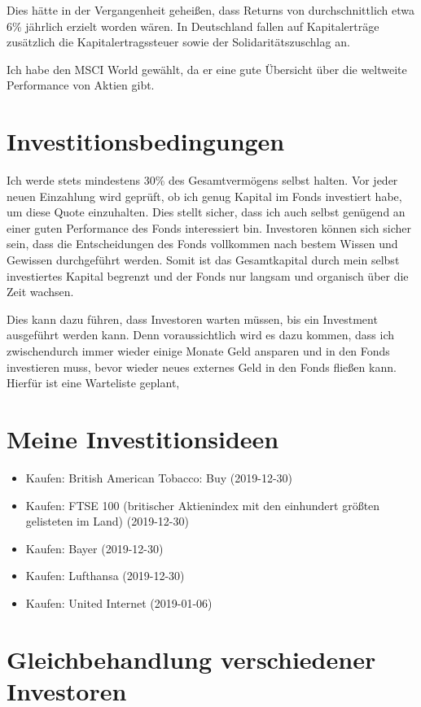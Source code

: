 \documentclass{article}
\begin{document}
Dies hätte in der Vergangenheit geheißen, dass Returns von durchschnittlich etwa 6\% jährlich erzielt worden wären. In Deutschland fallen auf Kapitalerträge zusätzlich die Kapitalertragssteuer sowie der Solidaritätszuschlag an.

Ich habe den MSCI World gewählt, da er eine gute Übersicht über die weltweite Performance von Aktien gibt.

\section{Investitionsbedingungen}

Ich werde stets mindestens 30\% des Gesamtvermögens selbst halten. Vor jeder neuen Einzahlung wird geprüft, ob ich genug Kapital im Fonds investiert habe, um diese Quote einzuhalten. Dies stellt sicher, dass ich auch selbst genügend an einer guten Performance des Fonds interessiert bin. Investoren können sich sicher sein, dass die Entscheidungen des Fonds vollkommen nach bestem Wissen und Gewissen durchgeführt werden. Somit ist das Gesamtkapital durch mein selbst investiertes Kapital begrenzt und der Fonds nur langsam und organisch über die Zeit wachsen.

Dies kann dazu führen, dass Investoren warten müssen, bis ein Investment ausgeführt werden kann. Denn voraussichtlich wird es dazu kommen, dass ich zwischendurch immer wieder einige Monate Geld ansparen und in den Fonds investieren muss, bevor wieder neues externes Geld in den Fonds fließen kann. Hierfür ist eine Warteliste geplant, 

\section{Meine Investitionsideen}

\begin{itemize}
    \item Kaufen: British American Tobacco: Buy (2019-12-30)
    \item Kaufen: FTSE 100 (britischer Aktienindex mit den einhundert größten gelisteten im Land) (2019-12-30)
    \item Kaufen: Bayer (2019-12-30)
    \item Kaufen: Lufthansa (2019-12-30)
    \item Kaufen: United Internet (2019-01-06)
\end{itemize}


\section{Gleichbehandlung verschiedener Investoren}
\end{document}
